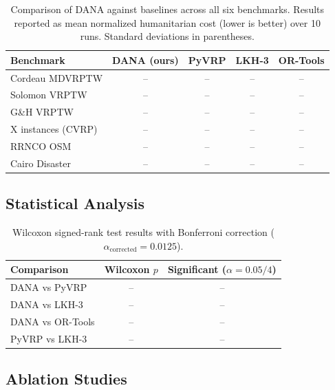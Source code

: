 \documentclass[12pt,a4paper]{article}
\begin{document}
\begin{table}[ht]
	\centering
	\begin{tabular}{lcccc}
		\toprule
		Benchmark          & DANA (ours) & PyVRP & LKH-3 & OR-Tools \\
		\midrule
		Cordeau MDVRPTW    & --          & --    & --    & --       \\
		Solomon VRPTW      & --          & --    & --    & --       \\
		G\&H VRPTW         & --          & --    & --    & --       \\
		X instances (CVRP) & --          & --    & --    & --       \\
		RRNCO OSM          & --          & --    & --    & --       \\
		Cairo Disaster     & --          & --    & --    & --       \\
		\bottomrule
	\end{tabular}
	\caption{Comparison of DANA against baselines across all six benchmarks.
		Results reported as mean normalized humanitarian cost (lower is better) over
		10 runs. Standard deviations in parentheses.}
	\label{tab:benchmarks}
\end{table}

\subsection{Statistical Analysis}

\begin{table}[ht]
	\centering
	\begin{tabular}{lcc}
		\toprule
		Comparison       & Wilcoxon $p$ & Significant ($\alpha = 0.05/4$) \\
		\midrule
		DANA vs PyVRP    & --           & --                              \\
		DANA vs LKH-3    & --           & --                              \\
		DANA vs OR-Tools & --           & --                              \\
		PyVRP vs LKH-3   & --           & --                              \\
		\bottomrule
	\end{tabular}
	\caption{Wilcoxon signed-rank test results with Bonferroni correction
		($\alpha_{\text{corrected}} = 0.0125$).}
	\label{tab:wilcoxon}
\end{table}

\subsection{Ablation Studies}
\end{document}
